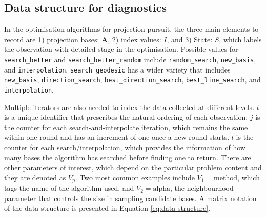 \hypertarget{data-structure-for-diagnostics}{%
\subsection{Data structure for
diagnostics}\label{data-structure-for-diagnostics}}

In the optimisation algorithms for projection pursuit, the three main
elements to record are 1) projection bases: \(\mathbf{A}\), 2) index
values: \(I\), and 3) State: \(S\), which labels the observation with
detailed stage in the optimisation. Possible values for
\texttt{search\_better} and \texttt{search\_better\_random} include
\texttt{random\_search}, \texttt{new\_basis}, and
\texttt{interpolation}. \texttt{search\_geodesic} has a wider variety
that includes \texttt{new\_basis}, \texttt{direction\_search},
\texttt{best\_direction\_search}, \texttt{best\_line\_search}, and
\texttt{interpolation}.

Multiple iterators are also needed to index the data collected at
different levels. \(t\) is a unique identifier that prescribes the
natural ordering of each observation; \(j\) is the counter for each
search-and-interpolate iteration, which remains the same within one
round and has an increment of one once a new round starts. \(l\) is the
counter for each search/interpolation, which provides the information of
how many bases the algorithm has searched before finding one to return.
There are other parameters of interest, which depend on the particular
problem content and they are denoted as \emph{\(V_{p}\)}. Two most
common examples include \(V_1 = \text{method}\), which tags the name of
the algorithm used, and \(V_2 = \text{alpha}\), the neighbourhood
parameter that controls the size in sampling candidate bases. A matrix
notation of the data structure is presented in Equation
\ref{eq:data-structure}.

